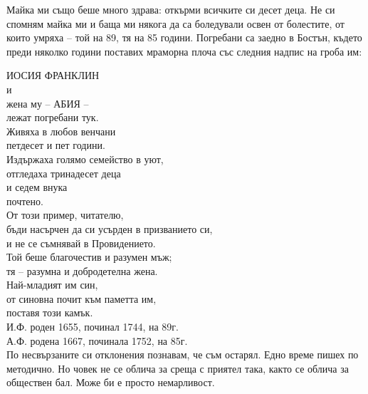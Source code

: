 \documentclass[12pt]{book}
\begin{document}
Майка ми също беше много здрава: откърми всичките си десет деца. Не си спомням майка ми и баща ми някога да са боледували освен от болестите, от които умряха – той на 89, тя на 85 години. Погребани са заедно в Бостън, където преди няколко години поставих мраморна плоча със следния надпис на гроба им: 

ИОСИЯ ФРАНКЛИН \\
и \\
жена му – АБИЯ –  \\
лежат погребани тук. \\
Живяха в любов венчани \\
петдесет и пет години.  \\
Издържаха голямо семейство в уют, \\
отгледаха тринадесет деца  \\
и седем внука  \\
почтено. \\
От този пример, читателю, \\
бъди насърчен да си усърден в призванието си, \\
и не се съмнявай в Провидението. \\
Той беше благочестив и разумен мъж; \\
тя – разумна и добродетелна жена. \\
Най-младият им син, \\
от синовна почит към паметта им, \\
поставя този камък. \\
И.Ф. роден 1655, починал 1744, на 89г. \\
А.Ф. родена 1667, починала 1752, на 85г.  \\

По несвързаните си отклонения познавам, че съм остарял. Едно време пишех по методично. Но човек не се облича за среща с приятел така, както се облича за обществен бал. Може би е просто немарливост.
\end{document}

